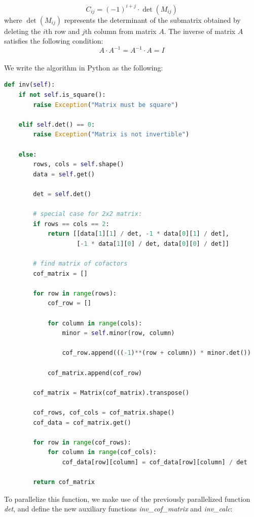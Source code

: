 $$
    C_{ij} = (-1)^{i+j} \cdot \det(M_{ij})
$$
where $\det(M_{ij})$ represents the determinant of the submatrix obtained by deleting the $i$th row and $j$th column from matrix $A$. The inverse of matrix $A$ satisfies the following condition:
$$
    A \cdot A^{-1} = A^{-1} \cdot A = I
$$
\pagebreak
\\
We write the algorithm in Python as the following:
\begin{lstlisting}[language=Python, label={Inverse function}]
def inv(self):
    if not self.is_square():
        raise Exception("Matrix must be square")

    elif self.det() == 0:
        raise Exception("Matrix is not invertible")

    else:
        rows, cols = self.shape()
        data = self.get()

        det = self.det()

        # special case for 2x2 matrix:
        if rows == cols == 2:
            return [[data[1][1] / det, -1 * data[0][1] / det],
                    [-1 * data[1][0] / det, data[0][0] / det]]

        # find matrix of cofactors
        cof_matrix = []

        for row in range(rows):
            cof_row = []

            for column in range(cols):
                minor = self.minor(row, column)

                cof_row.append(((-1)**(row + column)) * minor.det())

            cof_matrix.append(cof_row)

        cof_matrix = Matrix(cof_matrix).transpose()

        cof_rows, cof_cols = cof_matrix.shape()
        cof_data = cof_matrix.get()

        for row in range(cof_rows):
            for column in range(cof_cols):
                cof_data[row][column] = cof_data[row][column] / det

        return cof_matrix
\end{lstlisting}
To parallelize this function, we make use of the previously parallelized function \textit{det}, and define the new auxiliary functions \textit{inv\_cof\_matrix} and \textit{inv\_calc}:

